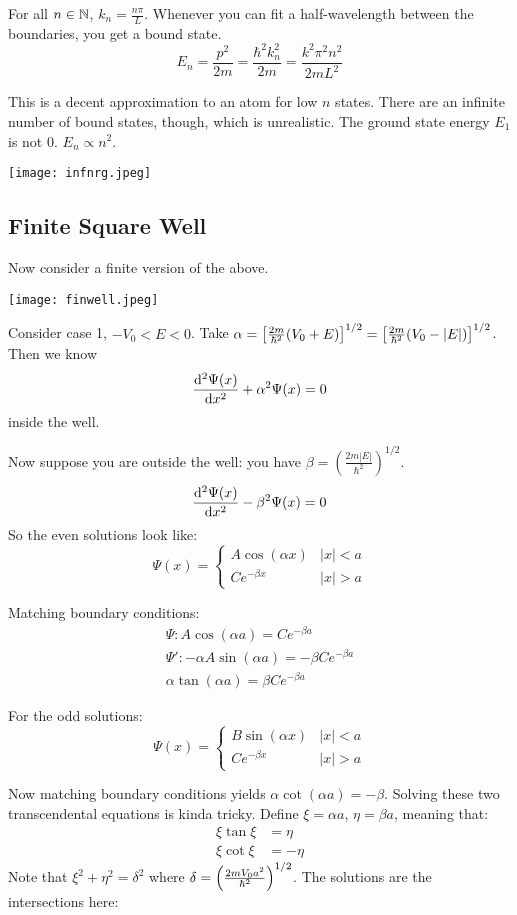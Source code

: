 For all $n \in \operatorname{\mathbb{N}}$, $k_n = \frac{n\pi}{L}$. Whenever you can fit a half-wavelength between the boundaries, you get a bound state.
\[ E_n = \frac{p^2}{2m} = \frac{\hbar^2 k_n^2}{2m} = \frac{k^2 \pi^2 n^2}{2mL^2} \]

This is a decent approximation to an atom for low $n$ states. There are an infinite number of bound states, though, which is
unrealistic. The ground state energy $E_1$ is not 0. $E_n \propto n^2$.

\texttt{[image: infnrg.jpeg]}

\subsection{Finite Square Well}
Now consider a finite version of the above.

\texttt{[image: finwell.jpeg]}

Consider case 1, $-V_0 < E < 0$.
Take $\alpha = \qty[\frac{2m}{\hbar^2}(V_0 + E)]^{1/2} = \qty[\frac{2m}{\hbar^2}(V_0 - |E|)]^{1/2}$.
Then we know
\[ \derivative{^2 \Psi(x)}{x^2} +\alpha^2 \Psi(x) = 0 \]
inside the well.

Now suppose you are outside the well:
you have $\beta = (\frac{2m|E|}{\hbar^2})^{1/2}$.
\[ \derivative{^2 \Psi(x)}{x^2} - \beta^2 \Psi(x) = 0 \]
So the even solutions look like:
\[
    \Psi(x) = \begin{cases}
        A \cos(\alpha x) & |x| < a \\
        Ce^{-\beta x} & |x| > a
    \end{cases}\]

Matching boundary conditions:
\begin{align*}
    \Psi: A \cos(\alpha a) = Ce^{-\beta a} \\
    \Psi': - \alpha A \sin(\alpha a) = -\beta Ce^{-\beta a} \\
    \alpha \tan(\alpha a) = \beta C e^{-\beta a}
\end{align*}

For the odd solutions:
\[ \Psi(x) = \begin{cases}
    B \sin(\alpha x) & |x| < a\\
    Ce^{-\beta x} & |x| > a
\end{cases}\]

Now matching boundary conditions yields $\alpha \cot(\alpha a) = -\beta$.
Solving these two transcendental equations is kinda tricky. Define $\xi = \alpha a$,
$\eta = \beta a$, meaning that:
\begin{align*}
    \xi \tan \xi &= \eta \\
    \xi \cot \xi &= - \eta
\end{align*}
Note that $\xi^2 + \eta^2 = \delta^2$ where $\delta = \qty(\frac{2mV_0 a^2}{\hbar^2})^{1/2}$.
The solutions are the intersections here:

